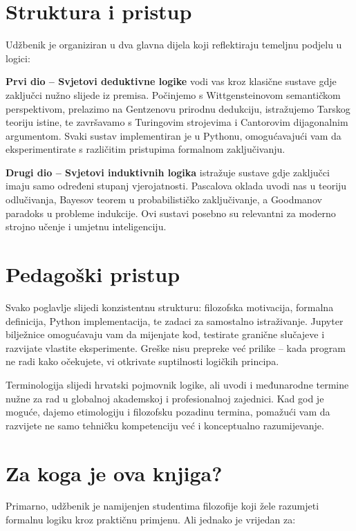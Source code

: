 \section*{Struktura i pristup}

Udžbenik je organiziran u dva glavna dijela koji reflektiraju temeljnu podjelu u logici:

\textbf{Prvi dio – Svjetovi deduktivne logike} vodi vas kroz klasične sustave gdje zaključci nužno slijede iz premisa. Počinjemo s Wittgensteinovom semantičkom perspektivom, prelazimo na Gentzenovu prirodnu dedukciju, istražujemo Tarskog teoriju istine, te završavamo s Turingovim strojevima i Cantorovim dijagonalnim argumentom. Svaki sustav implementiran je u Pythonu, omogućavajući vam da eksperimentirate s različitim pristupima formalnom zaključivanju.

\textbf{Drugi dio – Svjetovi induktivnih logika} istražuje sustave gdje zaključci imaju samo određeni stupanj vjerojatnosti. Pascalova oklada uvodi nas u teoriju odlučivanja, Bayesov teorem u probabilističko zaključivanje, a Goodmanov paradoks u probleme indukcije. Ovi sustavi posebno su relevantni za moderno strojno učenje i umjetnu inteligenciju.

\section*{Pedagoški pristup}

Svako poglavlje slijedi konzistentnu strukturu: filozofska motivacija, formalna definicija,
Python implementacija, te zadaci za samostalno istraživanje.
Jupyter bilježnice omogućavaju vam da mijenjate kod, testirate granične slučajeve i razvijate vlastite eksperimente. Greške nisu prepreke već prilike – kada program ne radi kako očekujete, vi otkrivate suptilnosti logičkih principa.

Terminologija slijedi hrvatski pojmovnik logike, ali uvodi i međunarodne termine nužne za rad u globalnoj akademskoj i profesionalnoj zajednici. Kad god je moguće, dajemo etimologiju i filozofsku pozadinu termina, pomažući vam da razvijete ne samo tehničku kompetenciju već i konceptualno razumijevanje.

\section*{Za koga je ova knjiga?}

Primarno, udžbenik je namijenjen studentima filozofije koji žele razumjeti formalnu logiku kroz praktičnu primjenu.
Ali jednako je vrijedan za:

